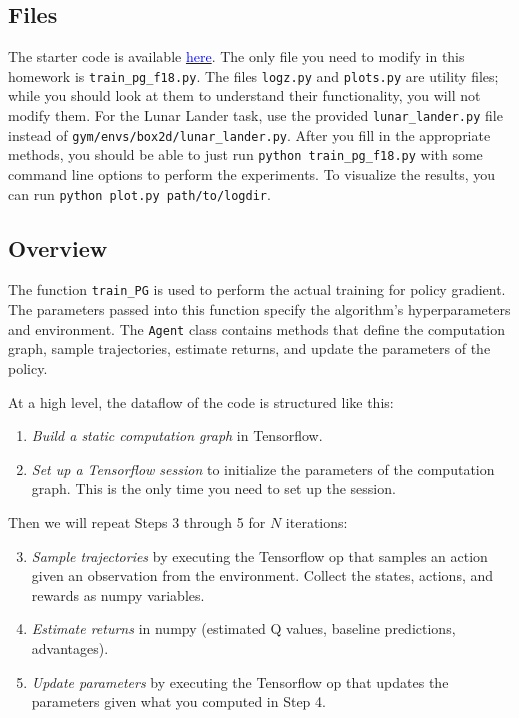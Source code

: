 \documentclass[12pt]{article}
\begin{document}
\subsection{Files}
The starter code is available \href{https://github.com/berkeleydeeprlcourse/homework/tree/master/hw2}{\textcolor{blue}{here}}.
The only file you need to modify in this homework is \verb|train_pg_f18.py|. The files \verb|logz.py| and \verb|plots.py| are utility files; while you should look at them to understand their functionality, you will not modify them. For the Lunar Lander task, use the provided \verb|lunar_lander.py| file instead of \verb|gym/envs/box2d/lunar_lander.py|. After you fill in the appropriate methods, you should be able to just run \verb|python train_pg_f18.py| with some command line options to perform the experiments. To visualize the results, you can run \verb|python plot.py path/to/logdir|.

\subsection{Overview}
The function \verb|train_PG| is used to perform the actual training for policy gradient. The parameters passed into this function specify the algorithm's hyperparameters and environment. The \verb|Agent| class contains methods that define the computation graph, sample trajectories, estimate returns, and update the parameters of the policy.

At a high level, the dataflow of the code is structured like this:
\begin{enumerate}
    \item \textit{Build a static computation graph} in Tensorflow.
    \item \textit{Set up a Tensorflow session} to initialize the parameters of the computation graph. This is the only time you need to set up the session.
\end{enumerate}
Then we will repeat Steps 3 through 5 for $N$ iterations:
\begin{enumerate}\setcounter{enumi}{2}
    \item \textit{Sample trajectories} by executing the Tensorflow op that samples an action given an observation from the environment. Collect the states, actions, and rewards as numpy variables.
    \item \textit{Estimate returns} in numpy (estimated Q values, baseline predictions, advantages).
    \item \textit{Update parameters} by executing the Tensorflow op that updates the parameters given what you computed in Step 4.
\end{enumerate}
\end{document}
